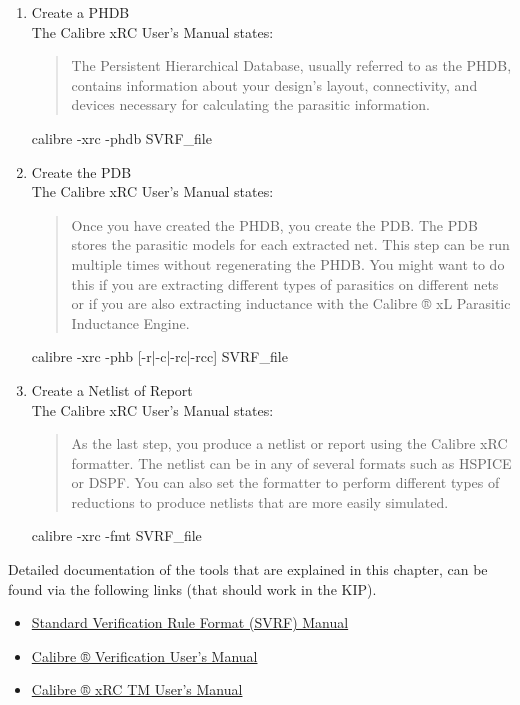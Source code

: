 \begin{enumerate}
	\item Create a \acrfull{PHDB}\\
		The Calibre xRC User's Manual \citep{calibre2014xrc} states:
		\begin{quote}
The Persistent Hierarchical Database, usually referred to as the PHDB, contains information
about your design’s layout, connectivity, and devices necessary for calculating the parasitic
information.
		\end{quote}
	\begin{lstbashplain}
calibre -xrc -phdb SVRF_file
	\end{lstbashplain}
	\item Create the \acrfull{PDB}\\
		The Calibre xRC User's Manual \citep{calibre2014xrc} states:
		\begin{quote}
Once you have created the PHDB, you create the PDB. The PDB stores the parasitic models for
each extracted net.
This step can be run multiple times without regenerating the PHDB. You might want to do this
if you are extracting different types of parasitics on different nets or if you are also extracting
inductance with the Calibre ® xL Parasitic Inductance Engine.
		\end{quote}
	\begin{lstbashplain}
calibre -xrc -phb [-r|-c|-rc|-rcc] SVRF_file
	\end{lstbashplain}
	\item Create a Netlist of Report\\
		The Calibre xRC User's Manual \citep{calibre2014xrc} states:
		\begin{quote}
As the last step, you produce a netlist or report using the Calibre xRC formatter. The netlist can
be in any of several formats such as HSPICE or DSPF. You can also set the formatter to
perform different types of reductions to produce netlists that are more easily simulated.
		\end{quote}
	\begin{lstbashplain}
calibre -xrc -fmt SVRF_file
	\end{lstbashplain}
\end{enumerate}

Detailed documentation of the tools that are explained in this chapter, can be
found via the following links (that should work in the KIP).
\begin{itemize}
	\item
		\href{file:///cad/products/mentor/calibre_2014.2_33.25/docs_cal_2014.2_14.13/docs/pdfdocs/svrf_ur.pdf}{Standard
		Verification Rule Format (SVRF) Manual}
	\item
		\href{file:///cad/products/mentor/calibre_2014.2_33.25/docs_cal_2014.2_14.13/docs/pdfdocs/calibre_ver_user.pdf}{
		Calibre ® Verification User’s Manual}
	\item \href{file:///cad/products/mentor/calibre_2014.2_33.25/docs_cal_2014.2_14.13/docs/pdfdocs/xrc_user.pdf}
		{Calibre ® xRC TM User’s Manual}
\end{itemize}
